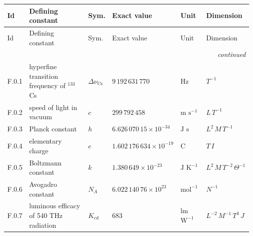 {\scriptsize\setlength{\tabcolsep}{3pt}
\begin{longtable}{@{}llllll@{}}
\toprule
Id & Defining constant & Sym. & Exact value & Unit & Dimension \\
\midrule\endfirsthead
\toprule
Id & Defining constant & Sym. & Exact value & Unit & Dimension \\
\midrule\endhead
\midrule\multicolumn{6}{r}{\emph{continued}}\\\endfoot
\bottomrule\endlastfoot
F.0.1 & hyperfine transition frequency of $^{133}$Cs & $\Delta\nu_{\mathrm{Cs}}$ & $9\,192\,631\,770$ & $\mathrm{Hz}$ & $T^{-1}$ \\
F.0.2 & speed of light in vacuum & $c$ & $299\,792\,458$ & $\mathrm{m}$ $\mathrm{s}^{-1}$ & $L\,T^{-1}$ \\
F.0.3 & Planck constant & $h$ & $6.626\,070\,15\times 10^{-34}$ & $\mathrm{J}$ $\mathrm{s}$ & $L^{2}\,M\,T^{-1}$ \\
F.0.4 & elementary charge & $e$ & $1.602\,176\,634\times 10^{-19}$ & $\mathrm{C}$ & $T\,I$ \\
F.0.5 & Boltzmann constant & $k$ & $1.380\,649\times 10^{-23}$ & $\mathrm{J}$ $\mathrm{K}^{-1}$ & $L^{2}\,M\,T^{-2}\,\Theta^{-1}$ \\
F.0.6 & Avogadro constant & $N_A$ & $6.022\,140\,76\times 10^{23}$ & $\mathrm{mol}^{-1}$ & $N^{-1}$ \\
F.0.7 & luminous efficacy of 540 THz radiation & $K_{\mathrm{cd}}$ & $683$ & $\mathrm{lm}$ $\mathrm{W}^{-1}$ & $L^{-2}\,M^{-1}\,T^{3}\,J$ \\
\end{longtable}}
